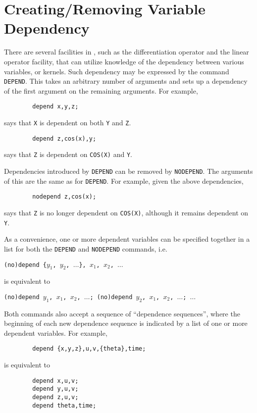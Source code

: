 \section{Creating/Removing Variable Dependency}
\hypertarget{command:DEPEND}{}
\hypertarget{command:NODEPEND}{}

There are several facilities in {\REDUCE}, such as the differentiation
operator and the linear operator facility, that
can utilize knowledge of the dependency between various variables, or
kernels.  Such dependency may be expressed by the command \texttt{DEPEND}.
This takes an arbitrary number of arguments and
sets up a dependency of the first argument on the remaining arguments.
For example,
\begin{verbatim}
        depend x,y,z;
\end{verbatim}
says that \texttt{X} is dependent on both \texttt{Y} and \texttt{Z}.
\begin{verbatim}
        depend z,cos(x),y;
\end{verbatim}
says that \texttt{Z} is dependent on \texttt{COS(X)} and \texttt{Y}.

Dependencies introduced by \texttt{DEPEND} can be removed by \texttt{NODEPEND}.
 The arguments of this are the same as for \texttt{DEPEND}.
For example, given the above dependencies,
\begin{verbatim}
        nodepend z,cos(x);
\end{verbatim}
says that \texttt{Z} is no longer dependent on \texttt{COS(X)}, although it remains
dependent on \texttt{Y}.

As a convenience, one or more dependent variables can be specified
together in a list for both the \texttt{DEPEND} and \texttt{NODEPEND}
commands, i.e.

\texttt{(no)depend \{$y_1$, $y_2$, $\ldots$\}, $x_1$, $x_2$, $\ldots$}

is equivalent to

\texttt{(no)depend $y_1$, $x_1$, $x_2$, $\ldots$; (no)depend $y_2$, $x_1$, $x_2$, $\ldots$; $\ldots$}

Both commands also accept a sequence of ``dependence sequences'',
where the beginning of each new dependence sequence is indicated by a
list of one or more dependent variables.  For example,
\begin{verbatim}
        depend {x,y,z},u,v,{theta},time;
\end{verbatim}
is equivalent to
\begin{verbatim}
        depend x,u,v;
        depend y,u,v;
        depend z,u,v;
        depend theta,time;
\end{verbatim}
